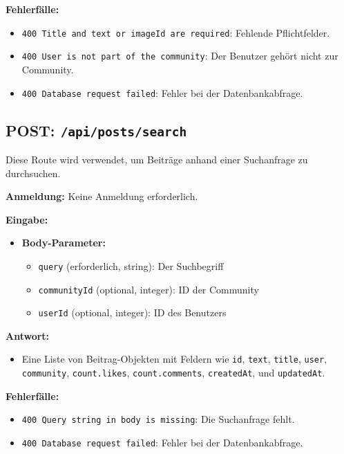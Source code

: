 \documentclass[a4paper,12pt]{article}
\begin{document}
\textbf{Fehlerfälle:}
\begin{itemize}
    \item \texttt{400 Title and text or imageId are required}:
        Fehlende Pflichtfelder.
    \item \texttt{400 User is not part of the community}:
        Der Benutzer gehört nicht zur Community.
    \item \texttt{400 Database request failed}:
        Fehler bei der Datenbankabfrage.
\end{itemize}

\newpage
\subsection{POST: \texttt{/api/posts/search}}

Diese Route wird verwendet, um Beiträge anhand einer Suchanfrage zu
durchsuchen.

\textbf{Anmeldung:} Keine Anmeldung erforderlich.

\textbf{Eingabe:}
\begin{itemize}
    \item \textbf{Body-Parameter:}
    \begin{itemize}
        \item \texttt{query} (erforderlich, string):
            Der Suchbegriff
        \item \texttt{communityId} (optional, integer):
            ID der Community
        \item \texttt{userId} (optional, integer):
            ID des Benutzers
    \end{itemize}
\end{itemize}

\textbf{Antwort:}
\begin{itemize}
    \item Eine Liste von Beitrag-Objekten mit Feldern wie
        \texttt{id},
        \texttt{text},
        \texttt{title},
        \texttt{user},
        \texttt{community},
        \texttt{count.likes},
        \texttt{count.comments},
        \texttt{createdAt},
        und \texttt{updatedAt}.
\end{itemize}

\textbf{Fehlerfälle:}
\begin{itemize}
    \item \texttt{400 Query string in body is missing}:
        Die Suchanfrage fehlt.
    \item \texttt{400 Database request failed}:
        Fehler bei der Datenbankabfrage.
\end{itemize}
\end{document}
